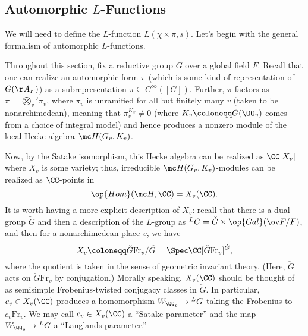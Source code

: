 \documentclass[../notes.tex]{subfiles}
\begin{document}
\subsection{Automorphic \texorpdfstring{ $L$}{ L}-Functions}
We will need to define the $L$-function $L(\chi\times\pi,s)$. Let's begin with the general formalism of automorphic $L$-functions.

Throughout this section, fix a reductive group $G$ over a global field $F$. Recall that one can realize an automorphic form $\pi$ (which is some kind of representation of $G(\AA_F)$) as a subrepresentation $\pi\subseteq C^\infty([G])$. Further, $\pi$ factors as $\pi=\bigotimes_v'\pi_v$, where $\pi_v$ is unramified for all but finitely many $v$ (taken to be nonarchimedean), meaning that $\pi_v^{K_v}\ne0$ (where $K_v\coloneqq G(\OO_v)$ comes from a choice of integral model) and hence produces a nonzero module of the local Hecke algebra $\mc H(G_v,K_v)$.

Now, by the Satake isomorphism, this Hecke algebra can be realized as $\CC[X_v]$ where $X_v$ is some variety; thus, irreducible $\mc H(G_v,K_v)$-modules can be realized as $\CC$-points in
\[\op{Hom}(\mc H,\CC)=X_v(\CC).\]
It is worth having a more explicit description of $X_v$: recall that there is a dual group $\check G$ and then a description of the $L$-group as $^LG=\check G\rtimes\op{Gal}(\ov F/F)$, and then for a nonarchimedean place $v$, we have
\[X_v\coloneqq\check G\mathrm{Fr}_v/\check G=\Spec\CC[\check G\mathrm{Fr}_v]^{\check G},\]
where the quotient is taken in the sense of geometric invariant theory. (Here, $\check G$ acts on $\check G\mathrm{Fr}_v$ by conjugation.) Morally speaking, $X_v(\CC)$ should be thought of as semisimple Frobenius-twisted conjugacy classes in $\check G$. In particular, $c_v\in X_v(\CC)$ produces a homomorphism $W_{\QQ_p}\to{^LG}$ taking the Frobenius to $c_v\mathrm{Fr}_v$. We may call $c_v\in X_v(\CC)$ a ``Satake parameter'' and the map $W_{\QQ_p}\to{^LG}$ a ``Langlands parameter.''
\end{document}
